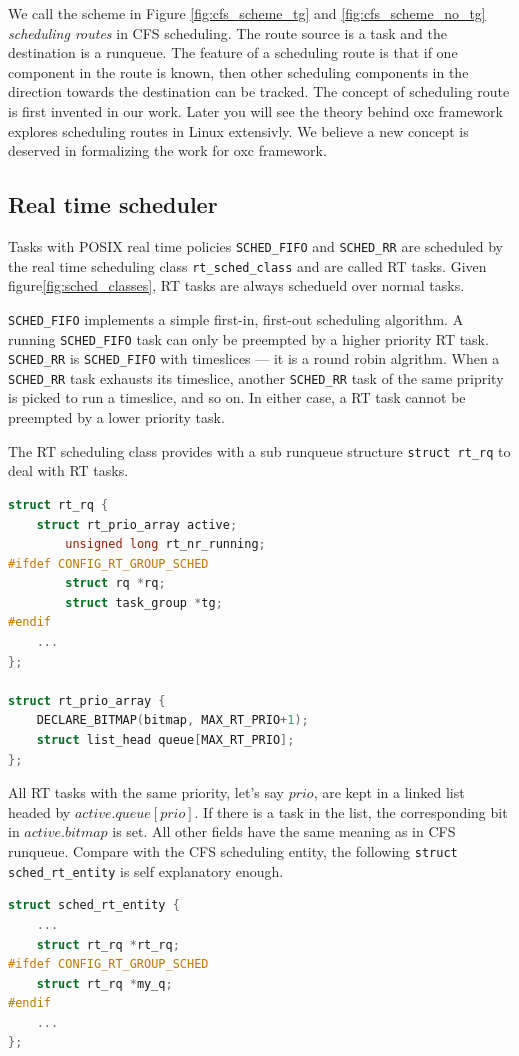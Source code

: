 We call the scheme in Figure \ref{fig:cfs_scheme_tg} and
\ref{fig:cfs_scheme_no_tg} \emph{scheduling routes} in CFS scheduling.
The route source is a task and the destination is a runqueue.  The
feature of a scheduling route is that if one component in the route is
known, then other scheduling components in the direction towards the
destination can be tracked.  The concept of scheduling route is first
invented in our work.  Later you will see the theory behind oxc
framework explores scheduling routes in Linux extensivly. We believe a
new concept is deserved in formalizing the work for oxc framework.

\subsection{Real time scheduler\label{sec:LinuxSched_rt}}

Tasks with POSIX real time policies \texttt{SCHED\_FIFO} and \texttt{SCHED\_RR}
are scheduled by the real time scheduling class \texttt{rt\_sched\_class} and
are called RT tasks. Given figure\ref{fig:sched_classes}, RT tasks are always
schedueld over normal tasks. 

\texttt{SCHED\_FIFO} implements a simple first-in, first-out scheduling 
algorithm. A running \texttt{SCHED\_FIFO} task can only be preempted by a 
higher priority RT task. \texttt{SCHED\_RR} is \texttt{SCHED\_FIFO} with 
timeslices --- it is a round robin algrithm. When a \texttt{SCHED\_RR}
task exhausts its timeslice, another \texttt{SCHED\_RR} task of the same
priprity is picked to run a timeslice, and so on. In either case, a RT task
cannot be preempted by a lower priority task.

The RT scheduling class provides with a sub runqueue structure 
\texttt{struct rt\_rq} to deal with RT tasks.
\begin{lstlisting}[language=C,
		caption={\texttt{The RT runqueue}},
		label={rtrunqueue}]
struct rt_rq {
	struct rt_prio_array active;
        unsigned long rt_nr_running;
#ifdef CONFIG_RT_GROUP_SCHED
        struct rq *rq;
        struct task_group *tg;
#endif
	...
};

struct rt_prio_array {
	DECLARE_BITMAP(bitmap, MAX_RT_PRIO+1); 
	struct list_head queue[MAX_RT_PRIO];
};
\end{lstlisting}
All RT tasks with the same priority, let's say $prio$, are kept in a linked 
list headed by $active.queue[prio]$. If there is a task in the list, the 
corresponding bit in $active.bitmap$ is set. All other fields have the same
meaning as in CFS runqueue. Compare with the CFS scheduling entity, the 
following \texttt{struct sched\_rt\_entity} is self explanatory enough. 
\begin{lstlisting}[language=C,
		caption={\texttt{The RT scheduling entity}},
		label={rt_entity}]
struct sched_rt_entity {
	...
	struct rt_rq *rt_rq;
#ifdef CONFIG_RT_GROUP_SCHED
	struct rt_rq *my_q;
#endif
	...
}; 
\end{lstlisting}

